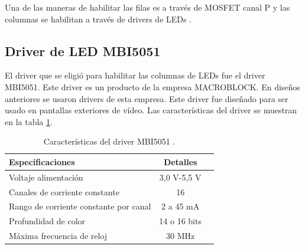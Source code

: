 
Una de las maneras de habilitar las filas es a través de MOSFET canal P y las columnas se habilitan a través de drivers de LEDs \citep{CONCEPTOMATRIZ}.
 
 





\subsection{Driver de LED MBI5051}
El driver que se eligió para habilitar las columnas de LEDs fue el driver MBI5051. Este driver es un producto de la empresa MACROBLOCK. En diseños anteriores se usaron drivers de esta empresa. Este driver fue diseñado para ser usado en pantallas exteriores de vídeo. Las características del driver se muestran en la tabla \ref{tab:driverled}. 

\begin{table}[h]
\centering
\caption[Características MBI5051]{Características del driver MBI5051 \protect\footnotemark.}
\begin{tabular}{l c c}
\toprule
\textbf{Especificaciones}& \textbf{Detalles}\\
\midrule 

Voltaje alimentación & 3,0 V-5,5 V\\
Canales de corriente constante & 16\\
Rango de corriente constante por canal & 2 a 45 mA\\
Profundidad de color & 14 o 16 bits\\
Máxima frecuencia de reloj & 30 MHz\\

\bottomrule
\hline
\end{tabular}
\label{tab:driverled}
\end{table}


